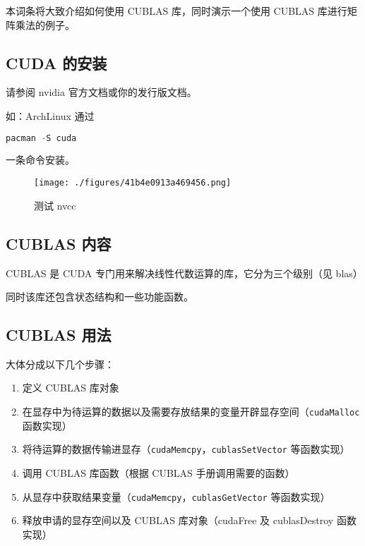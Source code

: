 
\begin{issues}
\issueMissDepend
\end{issues}

本词条将大致介绍如何使用 CUBLAS 库，同时演示一个使用 CUBLAS 库进行矩阵乘法的例子。
\subsection{CUDA 的安装}
请参阅 nvidia 官方文档或你的发行版文档。

如：ArchLinux 通过
\begin{lstlisting}[language=cpp]
pacman -S cuda
\end{lstlisting}
一条命令安装。

\begin{figure}[ht]
\centering
\texttt{[image: ./figures/41b4e0913a469456.png]}
\caption{测试 nvcc} \label{fig_cublas_3}
\end{figure}

\subsection{CUBLAS 内容}%

CUBLAS 是 CUDA 专门用来解决线性代数运算的库，它分为三个级别（见 blas）

同时该库还包含状态结构和一些功能函数。

\subsection{CUBLAS 用法}%

大体分成以下几个步骤：

\begin{enumerate}
  \item 定义 CUBLAS 库对象 
  \item  在显存中为待运算的数据以及需要存放结果的变量开辟显存空间（\verb|cudaMalloc| 函数实现）
  \item  将待运算的数据传输进显存（\verb|cudaMemcpy|，\verb|cublasSetVector| 等函数实现）
  \item 调用 CUBLAS 库函数（根据 CUBLAS 手册调用需要的函数）
  \item 从显存中获取结果变量（\verb|cudaMemcpy|，\verb|cublasGetVector| 等函数实现）
  \item  释放申请的显存空间以及 CUBLAS 库对象（cudaFree 及 cublasDestroy 函数实现）
\end{enumerate}

